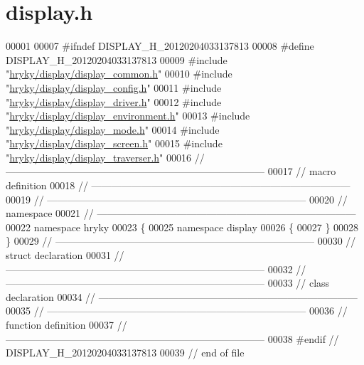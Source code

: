 \hypertarget{display_8h_source}{\section{display.\-h}
}

\begin{DoxyCode}
00001 
00007 \textcolor{preprocessor}{#ifndef DISPLAY\_H\_20120204033137813}
00008 \textcolor{preprocessor}{}\textcolor{preprocessor}{#define DISPLAY\_H\_20120204033137813}
00009 \textcolor{preprocessor}{}\textcolor{preprocessor}{#include "\hyperlink{display__common_8h}{hryky/display/display_common.h}"}
00010 \textcolor{preprocessor}{#include "\hyperlink{display__config_8h}{hryky/display/display_config.h}"}
00011 \textcolor{preprocessor}{#include "\hyperlink{display__driver_8h}{hryky/display/display_driver.h}"}
00012 \textcolor{preprocessor}{#include "\hyperlink{display__environment_8h}{hryky/display/display_environment.h}"}
00013 \textcolor{preprocessor}{#include "\hyperlink{display__mode_8h}{hryky/display/display_mode.h}"}
00014 \textcolor{preprocessor}{#include "\hyperlink{display__screen_8h}{hryky/display/display_screen.h}"}
00015 \textcolor{preprocessor}{#include "\hyperlink{display__traverser_8h}{hryky/display/display_traverser.h}"}
00016 \textcolor{comment}{//
      ------------------------------------------------------------------------------}
00017 \textcolor{comment}{// macro definition}
00018 \textcolor{comment}{//
      ------------------------------------------------------------------------------}
00019 \textcolor{comment}{//
      ------------------------------------------------------------------------------}
00020 \textcolor{comment}{// namespace}
00021 \textcolor{comment}{//
      ------------------------------------------------------------------------------}
00022 \textcolor{keyword}{namespace }hryky
00023 \{
00025 \textcolor{keyword}{namespace }display
00026 \{
00027 \}
00028 \}
00029 \textcolor{comment}{//
      ------------------------------------------------------------------------------}
00030 \textcolor{comment}{// struct declaration}
00031 \textcolor{comment}{//
      ------------------------------------------------------------------------------}
00032 \textcolor{comment}{//
      ------------------------------------------------------------------------------}
00033 \textcolor{comment}{// class declaration}
00034 \textcolor{comment}{//
      ------------------------------------------------------------------------------}
00035 \textcolor{comment}{//
      ------------------------------------------------------------------------------}
00036 \textcolor{comment}{// function definition}
00037 \textcolor{comment}{//
      ------------------------------------------------------------------------------}
00038 \textcolor{preprocessor}{#endif // DISPLAY\_H\_20120204033137813}
00039 \textcolor{preprocessor}{}\textcolor{comment}{// end of file}
\end{DoxyCode}
